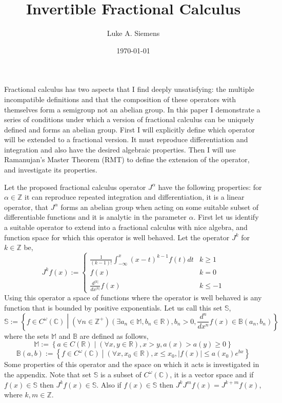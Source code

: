 \documentclass[%
 onecolumn,
 amsmath, amssymb, aps, pra, 10pt
]{revtex4-2}
\begin{document}
\title{Invertible Fractional Calculus}%
\author{Luke A. Siemens}
\noaffiliation
\date{\today}
\maketitle

Fractional calculus has two aspects that I find deeply unsatisfying: the multiple incompatible definitions and that the composition of these operators with themselves form a semigroup not an abelian group. In this paper I demonstrate a series of conditions under which a version of fractional calculus can be uniquely defined and forms an abelian group. First I will explicitly define which operator will be extended to a fractional version. It must reproduce differentiation and integration and also have the desired algebraic properties. Then I will use Ramanujan's Master Theorem (RMT) to define the extension of the operator, and investigate its properties.

Let the proposed fractional calculus operator $J^\alpha$ have the following properties: for $\alpha \in \mathbb{Z}$ it can reproduce repeated integration and differentiation, it is a linear operator, that $J^\alpha$ forms an abelian group when acting on some suitable subset of differentiable functions and it is analytic in the parameter $\alpha$. First let us identify a suitable operator to extend into a fractional calculus with nice algebra, and function space for which this operator is well behaved. Let the operator $J^k$ for $k \in \mathbb{Z}$ be,
\begin{equation}
J^k f(x) := \begin{cases} \frac{1}{(k-1)!}\int_{-\infty}^x (x - t)^{k - 1}f(t)dt & k \geq 1 \\ f(x) & k = 0 \\ \frac{d^{\left|k\right|}}{dx^{\left|k\right|}}f(x) & k \leq -1 \end{cases}
\label{integer_calculus}
\end{equation}
Using this operator a space of functions where the operator is well behaved is any function that is bounded by positive exponentials. Let us call this set $\mathbb{S}$,
\begin{equation}
\mathbb{S} := \left\lbrace f \in C^\omega(\mathbb{C}) \middle| (\forall n \in \mathbb{Z}^+)(\exists a_n \in \mathbb{M}, b_n \in \mathbb{R}), b_n > 0, \frac{d^n}{dx^n}f(x) \in \mathbb{B}(a_n, b_n) \right\rbrace
\label{exponentialy_bounded}
\end{equation}
where the sets $\mathbb{M}$ and $\mathbb{B}$ are defined as follows,
\[\mathbb{M} := \left\lbrace a \in C(\mathbb{R}) \middle| (\forall x, y \in \mathbb{R}), x > y, a(x) > a(y) \geq 0 \right\rbrace\]
\[\mathbb{B}(a, b) := \left\lbrace f \in C^\omega(\mathbb{C}) \middle| (\forall x, x_0 \in \mathbb{R}), x \leq x_0, |f(x)| \leq a(x_0)e^{bx} \right\rbrace\]
Some properties of this operator and the space on which it acts is investigated in the appendix. Note that set $\mathbb{S}$ is a subset of $C^{\omega}(\mathbb{C})$, it is a vector space and if $f(x) \in \mathbb{S}$ then $J^k f(x) \in \mathbb{S}$. Also if $f(x) \in \mathbb{S}$ then $J^k J^m f(x) = J^{k + m} f(x)$, where $k, m \in \mathbb{Z}$.
\end{document}
